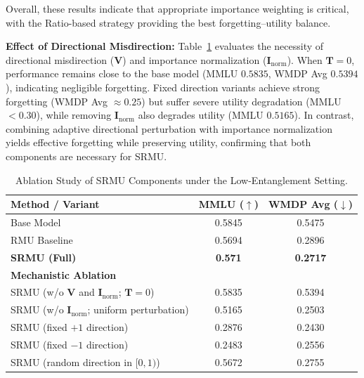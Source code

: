 Overall, these results indicate that appropriate importance weighting is critical, with the Ratio-based strategy providing the best forgetting–utility balance.
\\
\par 
\noindent
\textbf{Effect of Directional Misdirection:} Table~\ref{tab:ablation_results} evaluates the necessity of directional misdirection
($\mathbf{V}$) and importance normalization ($\mathbf{I}_{\text{norm}}$).
When $\mathbf{T}=0$, performance remains close to the base model
(MMLU $0.5835$, WMDP Avg $0.5394$), indicating negligible forgetting.
Fixed direction variants achieve strong forgetting
(WMDP Avg $\approx 0.25$) but suffer severe utility degradation
(MMLU $<0.30$), while removing $\mathbf{I}_{\text{norm}}$ also degrades
utility (MMLU $0.5165$).
In contrast, combining adaptive directional perturbation with importance
normalization yields effective forgetting while preserving utility,
confirming that both components are necessary for SRMU.

\begin{table}[H]
\centering
\caption{Ablation Study of SRMU Components under the Low-Entanglement Setting.}
\label{tab:ablation_results}

\begin{tabular}{lcc}
\toprule
\textbf{Method / Variant} 
& \textbf{MMLU ($\uparrow$)} 
& \textbf{WMDP Avg ($\downarrow$)} \\
\midrule
Base Model & 0.5845 & 0.5475 \\
RMU Baseline & 0.5694 & 0.2896 \\
\textbf{SRMU (Full)} & \textbf{0.571} & \textbf{0.2717} \\
\midrule
\multicolumn{3}{l}{\textbf{Mechanistic Ablation}} \\
SRMU (w/o $\mathbf{V}$ and $\mathbf{I}_{\text{norm}}$; $\mathbf{T}=0$) & 0.5835 & 0.5394 \\
SRMU (w/o $\mathbf{I}_{\text{norm}}$; uniform perturbation) & 0.5165 & 0.2503 \\
SRMU (fixed $+1$ direction) & 0.2876 & 0.2430 \\
SRMU (fixed $-1$ direction) & 0.2483 & 0.2556 \\
SRMU (random direction in $[0,1)$) & 0.5672 & 0.2755 \\
\bottomrule
\end{tabular}
\end{table}



